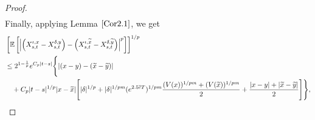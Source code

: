 \documentclass[11pt]{article}
\theoremstyle{theorem}
\theoremstyle{definition}
\newcommand{\1}{{\bf 1}}
\begin{document}
\begin{proof}
\begin{align*}
\end{align*}
Finally, applying Lemma $\ref{Cor2.1}$, we get
\begin{align*}
&\left[\mathbb{E}\left[\left|\left(X^{\iota, x}_{s,t}-X^{\delta,y}_{s,t}\right) - \left(X^{\iota, \widetilde{x}}_{s,t}-X^{\delta, \widetilde{y}}_{s,t}\right)\right|^p\right]\right]^{1/p} \notag\\
& \leq 2^{1-\frac{1}{p}} e^{C_p |t-s|} \Bigg\{|(x-y)-(\widetilde{x}-\widetilde{y})| \notag\\
& \quad + C_p |t-s|^{1/p} |x-\widetilde{x}| \Bigg[  |\delta|^{1/p}  +   |\delta|^{1/pm} (e^{2.5\overline{c}T})^{1/pm} \frac{  (V(x))^{1/pm}+(V(\widetilde{x}))^{1/pm}}{2}    +  \dfrac{|x-y|+ |\widetilde{x}-\widetilde{y}|}{2}   \Bigg] \Bigg\},

\end{align*}
\end{proof}
\end{document}
